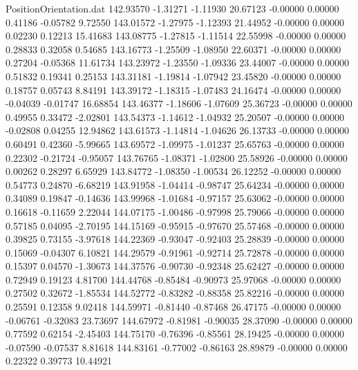 \begin{filecontents}{PositionOrientation.dat}
 142.93570   -1.31271   -1.11930    20.67123   -0.00000    0.00000    0.41186   -0.05782    9.72550
 143.01572   -1.27975   -1.12393    21.44952   -0.00000    0.00000    0.02230    0.12213   15.41683
 143.08775   -1.27815   -1.11514    22.55998   -0.00000    0.00000    0.28833    0.32058    0.54685
 143.16773   -1.25509   -1.08950    22.60371   -0.00000    0.00000    0.27204   -0.05368   11.61734
 143.23972   -1.23550   -1.09336    23.44007   -0.00000    0.00000    0.51832    0.19341    0.25153
 143.31181   -1.19814   -1.07942    23.45820   -0.00000    0.00000    0.18757    0.05743    8.84191
 143.39172   -1.18315   -1.07483    24.16474   -0.00000    0.00000   -0.04039   -0.01747   16.68854
 143.46377   -1.18606   -1.07609    25.36723   -0.00000    0.00000    0.49955    0.33472   -2.02801
 143.54373   -1.14612   -1.04932    25.20507   -0.00000    0.00000   -0.02808    0.04255   12.94862
 143.61573   -1.14814   -1.04626    26.13733   -0.00000    0.00000    0.60491    0.42360   -5.99665
 143.69572   -1.09975   -1.01237    25.65763   -0.00000    0.00000    0.22302   -0.21724   -0.95057
 143.76765   -1.08371   -1.02800    25.58926   -0.00000    0.00000    0.00262    0.28297    6.65929
 143.84772   -1.08350   -1.00534    26.12252   -0.00000    0.00000    0.54773    0.24870   -6.68219
 143.91958   -1.04414   -0.98747    25.64234   -0.00000    0.00000    0.34089    0.19847   -0.14636
 143.99968   -1.01684   -0.97157    25.63062   -0.00000    0.00000    0.16618   -0.11659    2.22044
 144.07175   -1.00486   -0.97998    25.79066   -0.00000    0.00000    0.57185    0.04095   -2.70195
 144.15169   -0.95915   -0.97670    25.57468   -0.00000    0.00000    0.39825    0.73155   -3.97618
 144.22369   -0.93047   -0.92403    25.28839   -0.00000    0.00000    0.15069   -0.04307    6.10821
 144.29579   -0.91961   -0.92714    25.72878   -0.00000    0.00000    0.15397    0.04570   -1.30673
 144.37576   -0.90730   -0.92348    25.62427   -0.00000    0.00000    0.72949    0.19123    4.81700
 144.44768   -0.85484   -0.90973    25.97068   -0.00000    0.00000    0.27502    0.32672   -1.85534
 144.52772   -0.83282   -0.88358    25.82216   -0.00000    0.00000    0.25591    0.12358    9.02418
 144.59971   -0.81440   -0.87468    26.47175   -0.00000    0.00000   -0.06761   -0.32083   23.73697
 144.67972   -0.81981   -0.90035    28.37090   -0.00000    0.00000    0.77592    0.62154   -2.45403
 144.75170   -0.76396   -0.85561    28.19425   -0.00000    0.00000   -0.07590   -0.07537    8.81618
 144.83161   -0.77002   -0.86163    28.89879   -0.00000    0.00000    0.22322    0.39773   10.44921

\end{filecontents}
